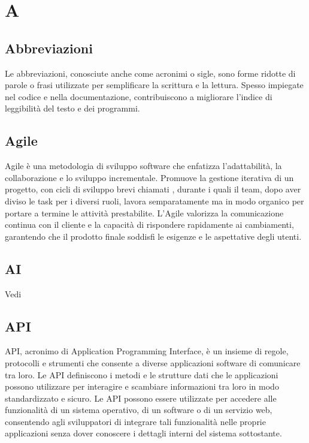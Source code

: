 \section{A}

\vspace{2em}
\subsection*{Abbreviazioni}
Le abbreviazioni, conosciute anche come acronimi o sigle, sono forme ridotte di parole o frasi utilizzate per semplificare la scrittura e la lettura. Spesso impiegate nel codice e nella documentazione, contribuiscono a migliorare l'indice di leggibilità del testo e dei programmi.

\vspace{2em}
\subsection*{Agile}
Agile è una metodologia di sviluppo software che enfatizza l'adattabilità, la collaborazione e lo sviluppo incrementale. Promuove la gestione iterativa di un progetto, con cicli di sviluppo brevi chiamati , durante i quali il team, dopo aver diviso le task per i diversi ruoli, lavora semparatamente ma in modo organico per portare a termine le attività prestabilite. L'Agile valorizza la comunicazione continua con il cliente e la capacità di rispondere rapidamente ai cambiamenti, garantendo che il prodotto finale soddisfi le esigenze e le aspettative degli utenti.

\vspace{2em}
\subsection*{AI}
\par Vedi 

\vspace{2em}
\subsection*{API}
API, acronimo di Application Programming Interface, è un insieme di regole, protocolli e strumenti che consente a diverse applicazioni software di comunicare tra loro. Le API definiscono i metodi e le strutture dati che le applicazioni possono utilizzare per interagire e scambiare informazioni tra loro in modo standardizzato e sicuro. Le API possono essere utilizzate per accedere alle funzionalità di un sistema operativo, di un software o di un servizio web, consentendo agli sviluppatori di integrare tali funzionalità nelle proprie applicazioni senza dover conoscere i dettagli interni del sistema sottostante.

